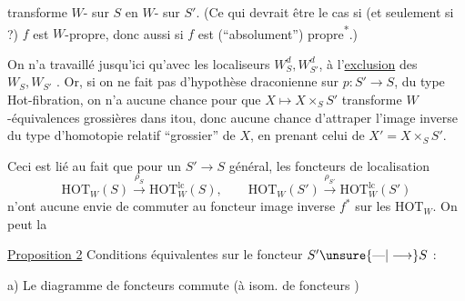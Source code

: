 transforme $W$- sur $S$ en $W$- sur $S'$. (Ce qui devrait être le cas si (et seulement si ?) $f$ est  $W$-propre, donc aussi si $f$ est (``absolument'') propre\textsuperscript{*}.)

On n'a travaillé jusqu'ici qu'avec les localiseurs $W_S^d,W_{S'}^d$, à l'\uline{exclusion} des $W_S,W_{S'}$ . Or, si on ne fait pas d'hypothèse draconienne sur $p:S'\longrightarrow S$, du type Hot-fibration, on n'a aucune  chance pour que $X\longmapsto X\times_S S'$ transforme $W$-équivalences grossières dans itou, donc aucune chance d'attraper l'image inverse du type d'homotopie relatif ``grossier'' de $X$, en prenant celui de $X'=X\times_S S'$.

Ceci est lié au fait que pour un $S'\longrightarrow S$ général, les foncteurs de localisation
\[
\mathrm{HOT}_W(S)\xrightarrow{\rho_S}\mathrm{HOT}^{\mathrm{lc}}_W(S),\qquad
\mathrm{HOT}_W(S')\xrightarrow{\rho_{S'}}\mathrm{HOT}^{\mathrm{lc}}_W(S')
\]
n'ont aucune envie de commuter au foncteur image inverse $f^*$ sur les $\mathrm{HOT}_W$. On peut  la

\uline{Proposition 2} Conditions équivalentes sur le foncteur $S'\unsure{\text{---}|\longrightarrow}S$ :

a) Le diagramme de foncteurs
commute (à isom.  de foncteurs  )
